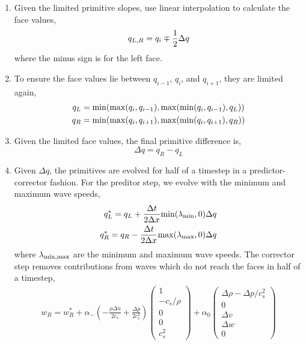 \documentclass{article}
\begin{document}
\begin{enumerate}
\item Given the limited primitive slopes, use linear interpolation to calculate the face values, 
\begin{equation}
    q_{L,R} = q_i \mp \frac{1}{2} \Delta q \\
\end{equation}
where the minus sign is for the left face. 

\item To ensure the face values lie between $q_{i-1}$, $q_i$, and $q_{i+1}$, they are limited again,
\begin{align}
    q_L &= {\rm min}( {\rm max}(q_i,q_{i-1}), {\rm max}({\rm min}(q_i,q_{i-1}), q_L)) \\ 
    q_R &= {\rm min}( {\rm max}(q_i,q_{i+1}), {\rm max}({\rm min}(q_i,q_{i+1}), q_R)) \\ 
\end{align}
\item Given the limited face values, the final primitive difference is,
\begin{equation}
 \Delta q = q_R - q_L
\end{equation}
\item Given $\Delta q$, the primitives are evolved for half of a timestep in a predictor-corrector fashion. 
For the preditor step, we evolve with the minimum and maximum wave speeds, 
\begin{align}
 q_L^* = q_L + \frac{\Delta t}{2 \Delta x} {\rm min}(\lambda_{\rm min}, 0) \Delta q \\
 q_R^* = q_R - \frac{\Delta t}{2 \Delta x} {\rm max}(\lambda_{\rm max}, 0) \Delta q
\end{align}
where $\lambda_{\rm min,max}$ are the minimum and maximum wave speeds. 
The corrector step removes contributions from waves which do not reach the faces in half of a timestep, 
\begin{align}
 w_R = w_R^*  + 
 \alpha_- \left( -\frac{\rho \Delta u}{2 c_s} + \frac{\Delta p}{2 c_s^2} \right) 
 \begin{pmatrix}
  1 \\ -c_s/\rho \\ 0 \\ 0 \\ c_s^2
 \end{pmatrix}
  +\alpha_0 
 \begin{pmatrix}
  \Delta \rho - \Delta p/c_s^2 \\ 0 \\ \Delta v \\ \Delta w \\ 0

\end{pmatrix}
\end{align}
\end{enumerate}
\end{document}
